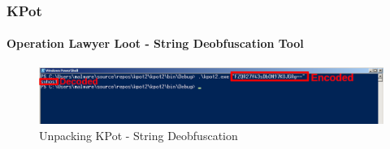 \documentclass[aspectratio=169]{beamer}
\begin{document}
{
\begin{frame}
  \frametitle{KPot}
  \framesubtitle{Operation Lawyer Loot - String Deobfuscation Tool}
  \begin{center}
    \begin{figure}
      \includegraphics[width=14cm]{kpot-unpacking-7}
      \caption{Unpacking KPot - String Deobfuscation}
    \end{figure}
  \end{center}
\end{frame}
}
\end{document}
